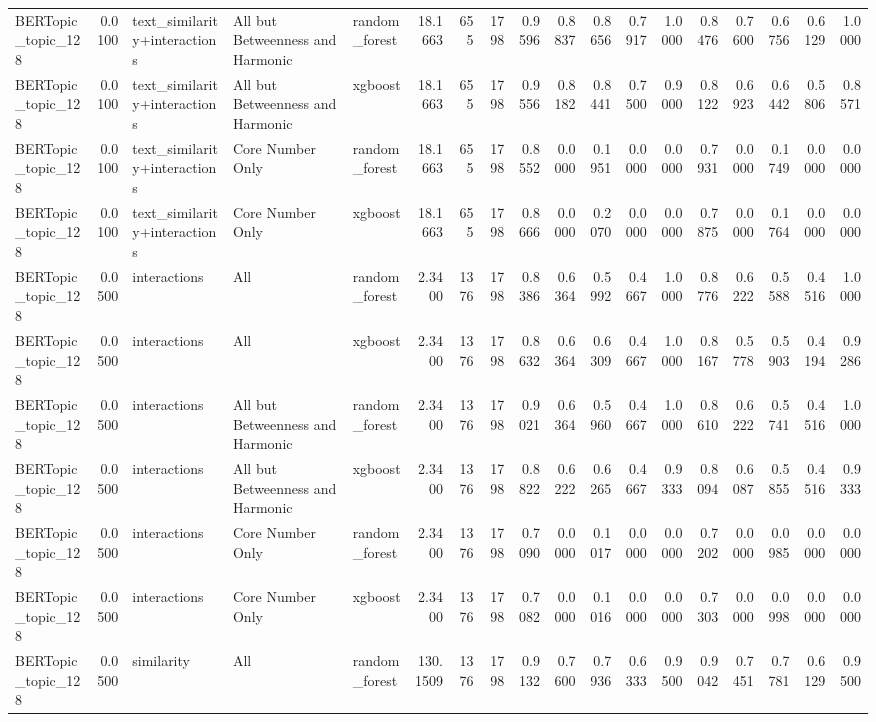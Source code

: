 \begin{tabular}{lrlllrrrrrrrrrrrrr}
BERTopic_topic_128 & 0.0100 & text_similarity+interactions & All but Betweenness and Harmonic & random_forest & 18.1663 & 655 & 1798 & 0.9596 & 0.8837 & 0.8656 & 0.7917 & 1.0000 & 0.8476 & 0.7600 & 0.6756 & 0.6129 & 1.0000 \\
BERTopic_topic_128 & 0.0100 & text_similarity+interactions & All but Betweenness and Harmonic & xgboost & 18.1663 & 655 & 1798 & 0.9556 & 0.8182 & 0.8441 & 0.7500 & 0.9000 & 0.8122 & 0.6923 & 0.6442 & 0.5806 & 0.8571 \\
BERTopic_topic_128 & 0.0100 & text_similarity+interactions & Core Number Only & random_forest & 18.1663 & 655 & 1798 & 0.8552 & 0.0000 & 0.1951 & 0.0000 & 0.0000 & 0.7931 & 0.0000 & 0.1749 & 0.0000 & 0.0000 \\
BERTopic_topic_128 & 0.0100 & text_similarity+interactions & Core Number Only & xgboost & 18.1663 & 655 & 1798 & 0.8666 & 0.0000 & 0.2070 & 0.0000 & 0.0000 & 0.7875 & 0.0000 & 0.1764 & 0.0000 & 0.0000 \\
BERTopic_topic_128 & 0.0500 & interactions & All & random_forest & 2.3400 & 1376 & 1798 & 0.8386 & 0.6364 & 0.5992 & 0.4667 & 1.0000 & 0.8776 & 0.6222 & 0.5588 & 0.4516 & 1.0000 \\
BERTopic_topic_128 & 0.0500 & interactions & All & xgboost & 2.3400 & 1376 & 1798 & 0.8632 & 0.6364 & 0.6309 & 0.4667 & 1.0000 & 0.8167 & 0.5778 & 0.5903 & 0.4194 & 0.9286 \\
BERTopic_topic_128 & 0.0500 & interactions & All but Betweenness and Harmonic & random_forest & 2.3400 & 1376 & 1798 & 0.9021 & 0.6364 & 0.5960 & 0.4667 & 1.0000 & 0.8610 & 0.6222 & 0.5741 & 0.4516 & 1.0000 \\
BERTopic_topic_128 & 0.0500 & interactions & All but Betweenness and Harmonic & xgboost & 2.3400 & 1376 & 1798 & 0.8822 & 0.6222 & 0.6265 & 0.4667 & 0.9333 & 0.8094 & 0.6087 & 0.5855 & 0.4516 & 0.9333 \\
BERTopic_topic_128 & 0.0500 & interactions & Core Number Only & random_forest & 2.3400 & 1376 & 1798 & 0.7090 & 0.0000 & 0.1017 & 0.0000 & 0.0000 & 0.7202 & 0.0000 & 0.0985 & 0.0000 & 0.0000 \\
BERTopic_topic_128 & 0.0500 & interactions & Core Number Only & xgboost & 2.3400 & 1376 & 1798 & 0.7082 & 0.0000 & 0.1016 & 0.0000 & 0.0000 & 0.7303 & 0.0000 & 0.0998 & 0.0000 & 0.0000 \\
BERTopic_topic_128 & 0.0500 & similarity & All & random_forest & 130.1509 & 1376 & 1798 & 0.9132 & 0.7600 & 0.7936 & 0.6333 & 0.9500 & 0.9042 & 0.7451 & 0.7781 & 0.6129 & 0.9500 \\

\end{tabular}
